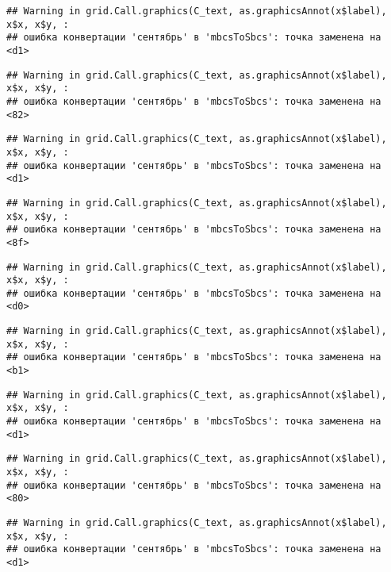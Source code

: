 \documentclass[
]{article}
\begin{document}
\begin{verbatim}
## Warning in grid.Call.graphics(C_text, as.graphicsAnnot(x$label), x$x, x$y, :
## ошибка конвертации 'сентябрь' в 'mbcsToSbcs': точка заменена на <d1>
\end{verbatim}

\begin{verbatim}
## Warning in grid.Call.graphics(C_text, as.graphicsAnnot(x$label), x$x, x$y, :
## ошибка конвертации 'сентябрь' в 'mbcsToSbcs': точка заменена на <82>
\end{verbatim}

\begin{verbatim}
## Warning in grid.Call.graphics(C_text, as.graphicsAnnot(x$label), x$x, x$y, :
## ошибка конвертации 'сентябрь' в 'mbcsToSbcs': точка заменена на <d1>
\end{verbatim}

\begin{verbatim}
## Warning in grid.Call.graphics(C_text, as.graphicsAnnot(x$label), x$x, x$y, :
## ошибка конвертации 'сентябрь' в 'mbcsToSbcs': точка заменена на <8f>
\end{verbatim}

\begin{verbatim}
## Warning in grid.Call.graphics(C_text, as.graphicsAnnot(x$label), x$x, x$y, :
## ошибка конвертации 'сентябрь' в 'mbcsToSbcs': точка заменена на <d0>
\end{verbatim}

\begin{verbatim}
## Warning in grid.Call.graphics(C_text, as.graphicsAnnot(x$label), x$x, x$y, :
## ошибка конвертации 'сентябрь' в 'mbcsToSbcs': точка заменена на <b1>
\end{verbatim}

\begin{verbatim}
## Warning in grid.Call.graphics(C_text, as.graphicsAnnot(x$label), x$x, x$y, :
## ошибка конвертации 'сентябрь' в 'mbcsToSbcs': точка заменена на <d1>
\end{verbatim}

\begin{verbatim}
## Warning in grid.Call.graphics(C_text, as.graphicsAnnot(x$label), x$x, x$y, :
## ошибка конвертации 'сентябрь' в 'mbcsToSbcs': точка заменена на <80>
\end{verbatim}

\begin{verbatim}
## Warning in grid.Call.graphics(C_text, as.graphicsAnnot(x$label), x$x, x$y, :
## ошибка конвертации 'сентябрь' в 'mbcsToSbcs': точка заменена на <d1>
\end{verbatim}
\end{document}
